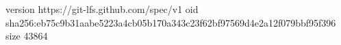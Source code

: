 version https://git-lfs.github.com/spec/v1
oid sha256:eb75c9b31aabe5223a4cb05b170a343c23f62bf97569d4e2a12f079bbf95f396
size 43864
